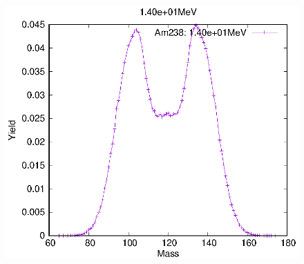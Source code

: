 \begin{figure}[htbp]
\begin{minipage}{0.33\textwidth} \begin{center} \includegraphics[width=\textwidth]{YA/Am238_1.40e+01.eps} \end{center} \end{minipage}
\end{figure}
\clearpage

